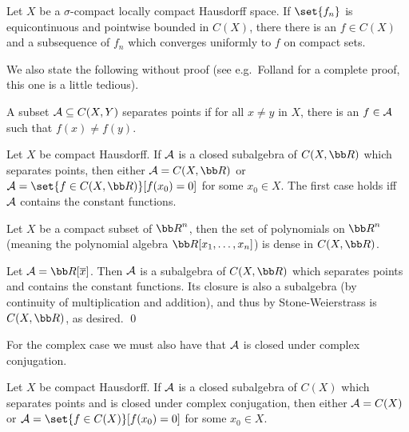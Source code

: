 \edefn

\bthrm[title={Arzela-Ascoli, II}]

    Let $X$ be a $\sigma$-compact locally compact Hausdorff space.
    If $\set{f_n}$ is equicontinuous and pointwise bounded in $C(X)$, there there is an $f\in C(X)$ and a subsequence of $f_n$ which converges uniformly
    to $f$ on compact sets.

\ethrm

We also state the following without proof (see e.g.\ Folland for a complete proof, this one is a little tedious).

\bdefn

    A subset ${{\cal A}}\subseteq C(X,Y)$ {\emphcolor separates points} if for all $x\neq y$ in $X$, there is an $f\in{{\cal A}}$ such that $f(x)\neq f(y)$.

\edefn

\bthrm[title=Stone-Weierstrass]

    Let $X$ be compact Hausdorff.
    If ${{\cal A}}$ is a closed subalgebra of $C(X,\bR)$ which separates points, then either $\A=C(X,\bR)$ or $\A=\set{f\in C(X,\bR)}[f(x_0)=0]$ for some $x_0\in X$.
    The first case holds iff ${{\cal A}}$ contains the constant functions.

\ethrm

\bcoro[title=Weierstrass approximation theorem]

    Let $X$ be a compact subset of $\bR^n$, then the set of polynomials on $\bR^n$ (meaning the polynomial algebra $\bR[x_1,\dots,x_n]$) is dense in $C(X,\bR)$.

\ecoro

\bproof

    Let $\A=\bR[\bar x]$.
    Then ${{\cal A}}$ is a subalgebra of $C(X,\bR)$ which separates points and contains the constant functions.
    Its closure is also a subalgebra (by continuity of multiplication and addition), and thus by Stone-Weierstrass is $C(X,\bR)$, as desired.
    \qed

\eproof

For the complex case we must also have that ${{\cal A}}$ is closed under complex conjugation.

\bthrm[title={Stone-Weierstrass, complex case}]

    Let $X$ be compact Hausdorff.
    If ${{\cal A}}$ is a closed subalgebra of $C(X)$ which separates points and is closed under complex conjugation, then either ${{\cal A}}=C(X)$ or $\A=\set{f\in C(X)}[f(x_0)=0]$
    for some $x_0\in X$.

\ethrm

